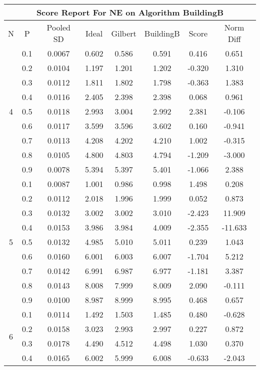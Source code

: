 \documentclass[11pt,a4paper]{report}
\begin{document}
\begin{longtable}{ | c | c || c | c | c | c | c | c | }
\hline
\multicolumn{8}{|c|}{ Score Report For NE on Algorithm BuildingB} \\
\hline
N & P & Pooled SD &  Ideal &  Gilbert & BuildingB  & Score & Norm Diff \\
 \hline
 \hline
 \endhead
\multirow{9}{*}{4} & 0.1 & 0.0067 & 0.602 & 0.586 & 0.591 & 0.416 & 0.651 \\
 & 0.2 & 0.0104 & 1.197 & 1.201 & 1.202 & -0.320 & 1.310 \\
 & 0.3 & 0.0112 & 1.811 & 1.802 & 1.798 & -0.363 & 1.383 \\
 & 0.4 & 0.0116 & 2.405 & 2.398 & 2.398 & 0.068 & 0.961 \\
 & 0.5 & 0.0118 & 2.993 & 3.004 & 2.992 & 2.381 & -0.106 \\
 & 0.6 & 0.0117 & 3.599 & 3.596 & 3.602 & 0.160 & -0.941 \\
 & 0.7 & 0.0113 & 4.208 & 4.202 & 4.210 & 1.002 & -0.315 \\
 & 0.8 & 0.0105 & 4.800 & 4.803 & 4.794 & -1.209 & -3.000 \\
 & 0.9 & 0.0078 & 5.394 & 5.397 & 5.401 & -1.066 & 2.388 \\
 \hline
\multirow{9}{*}{5} & 0.1 & 0.0087 & 1.001 & 0.986 & 0.998 & 1.498 & 0.208 \\
 & 0.2 & 0.0112 & 2.018 & 1.996 & 1.999 & 0.052 & 0.873 \\
 & 0.3 & 0.0132 & 3.002 & 3.002 & 3.010 & -2.423 & 11.909 \\
 & 0.4 & 0.0153 & 3.986 & 3.984 & 4.009 & -2.355 & -11.633 \\
 & 0.5 & 0.0132 & 4.985 & 5.010 & 5.011 & 0.239 & 1.043 \\
 & 0.6 & 0.0160 & 6.001 & 6.003 & 6.007 & -1.704 & 5.212 \\
 & 0.7 & 0.0142 & 6.991 & 6.987 & 6.977 & -1.181 & 3.387 \\
 & 0.8 & 0.0143 & 8.008 & 7.999 & 8.009 & 2.090 & -0.111 \\
 & 0.9 & 0.0100 & 8.987 & 8.999 & 8.995 & 0.468 & 0.657 \\
 \hline
\multirow{9}{*}{6} & 0.1 & 0.0114 & 1.492 & 1.503 & 1.485 & 0.480 & -0.628 \\
 & 0.2 & 0.0158 & 3.023 & 2.993 & 2.997 & 0.227 & 0.872 \\
 & 0.3 & 0.0178 & 4.490 & 4.512 & 4.498 & 1.030 & 0.370 \\
 & 0.4 & 0.0165 & 6.002 & 5.999 & 6.008 & -0.633 & -2.043 \\

\end{longtable}
\end{document}
